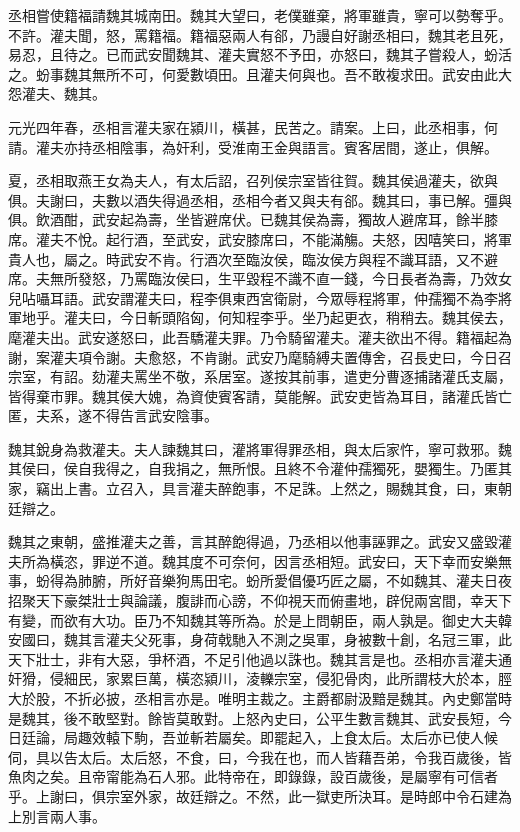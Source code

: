 丞相嘗使籍福請魏其城南田。魏其大望曰，老僕雖棄，將軍雖貴，寧可以勢奪乎。不許。灌夫聞，怒，罵籍福。籍福惡兩人有郤，乃謾自好謝丞相曰，魏其老且死，易忍，且待之。已而武安聞魏其、灌夫實怒不予田，亦怒曰，魏其子嘗殺人，蚡活之。蚡事魏其無所不可，何愛數頃田。且灌夫何與也。吾不敢複求田。武安由此大怨灌夫、魏其。

元光四年春，丞相言灌夫家在潁川，橫甚，民苦之。請案。上曰，此丞相事，何請。灌夫亦持丞相陰事，為奸利，受淮南王金與語言。賓客居間，遂止，俱解。

夏，丞相取燕王女為夫人，有太后詔，召列侯宗室皆往賀。魏其侯過灌夫，欲與俱。夫謝曰，夫數以酒失得過丞相，丞相今者又與夫有郤。魏其曰，事已解。彊與俱。飲酒酣，武安起為壽，坐皆避席伏。已魏其侯為壽，獨故人避席耳，餘半膝席。灌夫不悅。起行酒，至武安，武安膝席曰，不能滿觴。夫怒，因嘻笑曰，將軍貴人也，屬之。時武安不肯。行酒次至臨汝侯，臨汝侯方與程不識耳語，又不避席。夫無所發怒，乃罵臨汝侯曰，生平毀程不識不直一錢，今日長者為壽，乃效女兒呫囁耳語。武安謂灌夫曰，程李俱東西宮衛尉，今眾辱程將軍，仲孺獨不為李將軍地乎。灌夫曰，今日斬頭陷匈，何知程李乎。坐乃起更衣，稍稍去。魏其侯去，麾灌夫出。武安遂怒曰，此吾驕灌夫罪。乃令騎留灌夫。灌夫欲出不得。籍福起為謝，案灌夫項令謝。夫愈怒，不肯謝。武安乃麾騎縛夫置傳舍，召長史曰，今日召宗室，有詔。劾灌夫罵坐不敬，系居室。遂按其前事，遣吏分曹逐捕諸灌氏支屬，皆得棄市罪。魏其侯大媿，為資使賓客請，莫能解。武安吏皆為耳目，諸灌氏皆亡匿，夫系，遂不得告言武安陰事。

魏其銳身為救灌夫。夫人諫魏其曰，灌將軍得罪丞相，與太后家忤，寧可救邪。魏其侯曰，侯自我得之，自我捐之，無所恨。且終不令灌仲孺獨死，嬰獨生。乃匿其家，竊出上書。立召入，具言灌夫醉飽事，不足誅。上然之，賜魏其食，曰，東朝廷辯之。

魏其之東朝，盛推灌夫之善，言其醉飽得過，乃丞相以他事誣罪之。武安又盛毀灌夫所為橫恣，罪逆不道。魏其度不可奈何，因言丞相短。武安曰，天下幸而安樂無事，蚡得為肺腑，所好音樂狗馬田宅。蚡所愛倡優巧匠之屬，不如魏其、灌夫日夜招聚天下豪桀壯士與論議，腹誹而心謗，不仰視天而俯畫地，辟倪兩宮間，幸天下有變，而欲有大功。臣乃不知魏其等所為。於是上問朝臣，兩人孰是。御史大夫韓安國曰，魏其言灌夫父死事，身荷戟馳入不測之吳軍，身被數十創，名冠三軍，此天下壯士，非有大惡，爭杯酒，不足引他過以誅也。魏其言是也。丞相亦言灌夫通奸猾，侵細民，家累巨萬，橫恣潁川，淩轢宗室，侵犯骨肉，此所謂枝大於本，脛大於股，不折必披，丞相言亦是。唯明主裁之。主爵都尉汲黯是魏其。內史鄭當時是魏其，後不敢堅對。餘皆莫敢對。上怒內史曰，公平生數言魏其、武安長短，今日廷論，局趣效轅下駒，吾並斬若屬矣。即罷起入，上食太后。太后亦已使人候伺，具以告太后。太后怒，不食，曰，今我在也，而人皆藉吾弟，令我百歲後，皆魚肉之矣。且帝甯能為石人邪。此特帝在，即錄錄，設百歲後，是屬寧有可信者乎。上謝曰，俱宗室外家，故廷辯之。不然，此一獄吏所決耳。是時郎中令石建為上別言兩人事。

